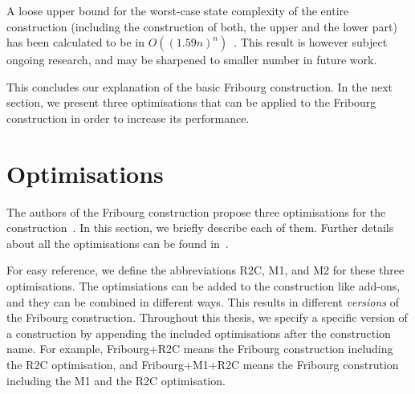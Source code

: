 


A loose upper bound for the worst-case state complexity of the entire construction (including the construction of both, the upper and the lower part) has been calculated to be in $O((1.59n)^n)$~\cite{2014_joel_ulrich}. This result is however subject ongoing research, and may be sharpened to smaller number in future work.

This concludes our explanation of the basic Fribourg construction. In the next section, we present three optimisations that can be applied to the Fribourg construction in order to increase its performance. 


\section{Optimisations}
\label{3_optimisations}
The authors of the Fribourg construction propose three optimisations for the construction~\cite{2014_joel_ulrich}. In this section, we briefly describe each of them. Further details about all the optimisations can be found in~\cite{2014_joel_ulrich}.

For easy reference, we define the abbreviations R2C, M1, and M2 for these three optimisations. The optimsiations can be added to the construction like add-ons, and they can be combined in different ways. This results in different \textit{versions} of the Fribourg construction. Throughout this thesis, we specify a specific version of a construction by appending the included optimisations after the construction name. For example, Fribourg+R2C means the Fribourg construction including the R2C optimisation, and Fribourg+M1+R2C means the Fribourg constrution including the M1 and the R2C optimisation.

